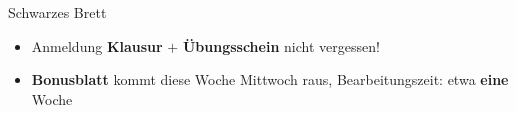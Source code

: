 



\morescalingdelimiters



\begin{frame}{Schwarzes Brett}
	\begin{itemize}
		\item Anmeldung \textbf{Klausur} $+$ \textbf{Übungsschein} nicht vergessen!
		\item \textbf{Bonusblatt} kommt diese Woche Mittwoch raus, Bearbeitungszeit: etwa \textbf{eine} Woche
	\end{itemize}
\end{frame}

\framePrevEpisode






